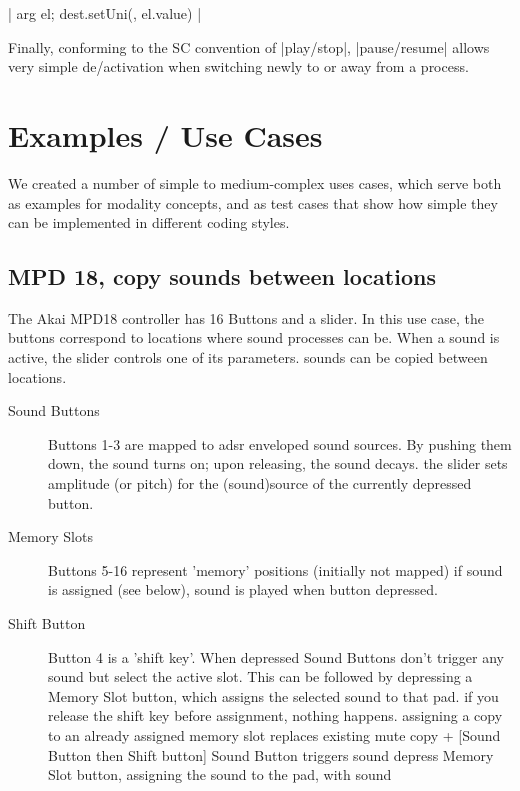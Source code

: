 \documentclass{article}
\begin{document}
|{ arg el; dest.setUni(\amp, el.value) }|

Finally, conforming to the SC convention of |play/stop|, |pause/resume| allows very simple de/activation when switching newly to or away from a process. 

\section{Examples / Use Cases}
\label{sec:examples_use_cases}

We created a number of simple to medium-complex uses cases, which serve both as examples for modality concepts, and as test cases that show how simple they can be implemented in different coding styles. 

\subsection{MPD 18, copy sounds between locations}
\label{sub:mpd_18}

The Akai MPD18 controller has 16 Buttons and a slider. In this use case, the buttons correspond to locations where sound processes can be. When a sound is active, the slider controls one of its parameters. sounds can be copied between locations.

\begin{description}
 \item [Sound Buttons] Buttons 1-3 are mapped to adsr enveloped sound sources.
        By pushing them down, the sound turns on; upon releasing, the sound decays.
    the slider sets amplitude (or pitch) for the (sound)source of the currently depressed button.
 \item [Memory Slots] Buttons 5-16 represent 'memory' positions (initially not mapped)
        if sound is assigned (see below), sound is played when button depressed.
 \item [Shift Button] Button 4 is a 'shift key'. When depressed
        Sound Buttons don't trigger any sound but select the active slot. This can be followed by
        depressing a Memory Slot button, which assigns the selected sound to that pad.
        if you release the shift key before assignment, nothing happens.
        assigning a copy to an already assigned memory slot replaces existing
        mute copy + [Sound Button then Shift button]
        Sound Button triggers sound
        depress Memory Slot button, assigning the sound to the pad, with sound
\end{description}
       
\end{document}
